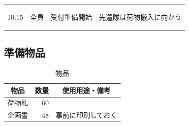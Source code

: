 \begin{longtable}[c]{|p{}|p{}|p{}|p{}|}
  \begin{tpacol}
    10:15
  \end{tpacol}&
  \begin{tpbcol}
    全員
  \end{tpbcol}&
  \begin{tpccol}
    受付準備開始
  \end{tpccol}&
  \begin{tpdcol}
    先遣隊は荷物搬入に向かう \par
  \end{tpdcol}\\


\end{longtable}
\normalsize

\subsection{準備物品}
\begin{table}[h]
  \centering
  \caption{物品}
  \begin{tabular}{lrl}
    \hline
    \multicolumn{1}{c}{物品} & \multicolumn{1}{c}{数量} & \multicolumn{1}{c}{使用用途・備考} \\
    \hline
    荷物札 & 60 &  \\
    企画書 & 48 & 事前に印刷しておく \\
    \hline  
  \end{tabular}
\end{table}